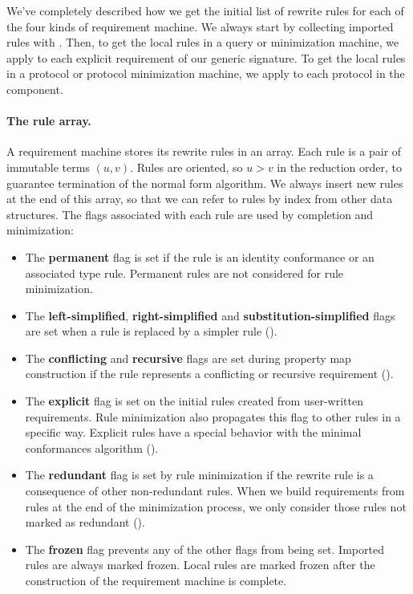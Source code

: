 \documentclass[../generics]{subfiles}
\begin{document}
We've completely described how we get the initial list of rewrite rules for each of the four kinds of requirement machine. We always start by collecting imported rules with . Then, to get the local rules in a query or minimization machine, we apply  to each explicit requirement of our generic signature. To get the local rules in a protocol or protocol minimization machine, we apply  to each protocol in the component.

\paragraph{The rule array.}
%
%
A requirement machine stores its rewrite rules in an array. Each rule is a pair of immutable terms $(u,v)$. Rules are oriented, so $u>v$ in the reduction order, to guarantee termination of the normal form algorithm. We always insert new rules at the end of this array, so that we can refer to rules by index from other data structures. The flags associated with each rule are used by completion and minimization:
\begin{itemize}
\item The \textbf{permanent} flag is set if the rule is an identity conformance or an associated type rule. Permanent rules are not considered for rule minimization.
\item The \textbf{left-simplified}, \textbf{right-simplified} and \textbf{substitution-simplified} flags are set when a rule is replaced by a simpler rule ().
\item The \textbf{conflicting} and \textbf{recursive} flags are set during property map construction if the rule represents a conflicting or recursive requirement ().
\item The \textbf{explicit} flag is set on the initial rules created from user-written requirements. Rule minimization also propagates this flag to other rules in a specific way. Explicit rules have a special behavior with the minimal conformances algorithm ().
\item The \textbf{redundant} flag is set by rule minimization if the rewrite rule is a consequence of other non-redundant rules. When we build requirements from rules at the end of the minimization process, we only consider those rules not marked as redundant ().
\item The \textbf{frozen} flag prevents any of the other flags from being set. Imported rules are always marked frozen. Local rules are marked frozen after the construction of the requirement machine is complete.
\end{itemize}
\end{document}

